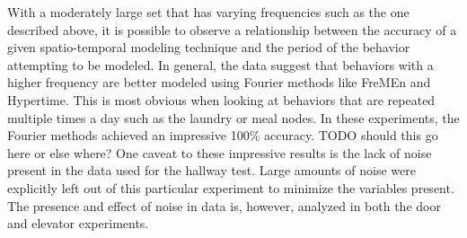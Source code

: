 With a moderately large set that has varying frequencies such as the one
described above, it is possible to observe a relationship between the accuracy
of a given spatio-temporal modeling technique and the period of the behavior
attempting to be modeled. In general, the data suggest that behaviors with
a higher frequency are better modeled using Fourier methods like FreMEn and
Hypertime. This is most obvious when looking at behaviors that are repeated multiple
times a day such as the laundry or meal nodes. In these experiments, the Fourier
methods achieved an impressive 100\% accuracy. TODO should this go here or
else where? One caveat to these impressive results is the lack of noise
present in the data used for the hallway test. Large amounts of noise were
explicitly left out of this particular experiment to minimize the variables
present. The presence and effect of noise in data is, however, analyzed in
both the door and elevator experiments. \\

\begin{table}[h!]
  \centering
  \caption{Hallway Laundry Section}
\end{table}

\begin{table}[h!]
  \centering
  \caption{Hallway Meal Section 0}
\end{table}

